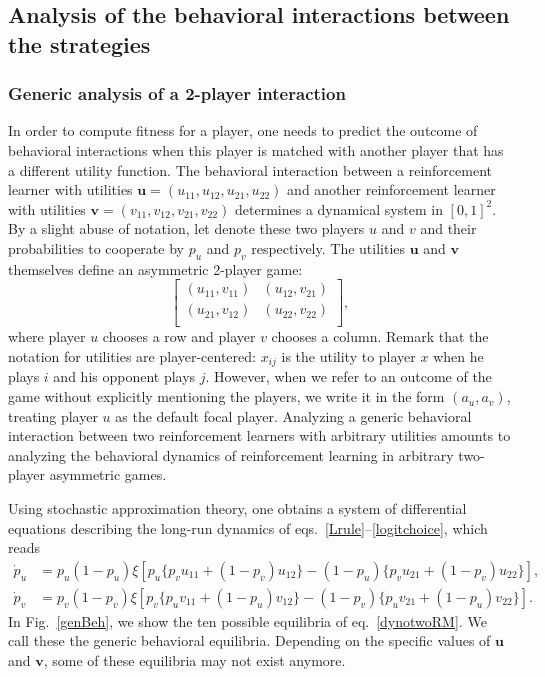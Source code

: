\documentclass[11pt,reqno]{amsart}
\newcommand{\ac}{a} %
\newcommand{\p}{p} %
\newcommand{\xr}{\xi} %
\newcommand{\pf}{u} %
\newcommand{\vpf}{\mathbf{u}} %
\newcommand{\pft}{v} %
\newcommand{\vpft}{\mathbf{v}} %
\begin{document}
\subsection{Analysis of the behavioral interactions between the strategies}


\subsubsection{Generic analysis of a 2-player interaction}

In order to compute fitness for a player, one needs to predict the outcome of behavioral interactions when this player is matched with another player that has a different utility function. The behavioral interaction between a reinforcement learner with utilities $\vpf = (\pf_{11},\pf_{12},\pf_{21},\pf_{22})$ and another reinforcement learner with utilities $\vpft = (\pft_{11},\pft_{12},\pft_{21},\pft_{22})$ determines a dynamical system in $[0,1]^2$. By a slight abuse of notation, let denote these two players $\pf$ and $\pft$ and their probabilities to cooperate by $\p_{\pf}$ and $\p_{\pft}$ respectively. The utilities $\vpf$ and $\vpft$ themselves define an asymmetric 2-player game:
\begin{equation}
\label{prefMat}
\left[ \begin{array}{cc}
    (\pf_{11}, \pft_{11}) & (\pf_{12}, \pft_{21})  \\ 
    (\pf_{21}, \pft_{12}) & (\pf_{22}, \pft_{22})  \\ 
  \end{array}  \right],
\end{equation}
where player $\pf$ chooses a row and player $\pft$ chooses a column. Remark that the notation for utilities are player-centered: $x_{ij}$ is the utility to player $x$ when he plays $i$ and his opponent plays $j$. However, when we refer to an outcome of the game without explicitly mentioning the players, we write it in the form $(\ac_\pf, \ac_\pft)$, treating player $\pf$ as the default focal player. Analyzing a generic behavioral interaction between two reinforcement learners with arbitrary utilities amounts to analyzing the behavioral dynamics of reinforcement learning in arbitrary two-player asymmetric games.

Using stochastic approximation theory, one obtains a system of differential equations describing the long-run dynamics of eqs.~\ref{Lrule}--\ref{logitchoice}, which reads
\begin{align}
\label{dynotwoRM}
 \dot{\p}_u  &=  \p_u(1-\p_u) \xr \left[ \p_u  \{\p_v \pf_{11}+(1-\p_v)\pf_{12}\}  - (1-\p_u) \{\p_v \pf_{21}+(1-\p_v)\pf_{22}\}  \right], \nonumber \\
 \dot{\p}_v  &=  \p_v(1-\p_v) \xr \left[ \p_v \{\p_u \pft_{11}+(1-\p_u)\pft_{12}\}  - (1-\p_v) \{\p_u \pft_{21}+(1-\p_u)\pft_{22}\}  \right].
\end{align}
In Fig.~\ref{genBeh}, we show the ten possible equilibria of eq.~\ref{dynotwoRM}. We call these the generic behavioral equilibria. Depending on the specific values of $\vpf$ and $\vpft$, some of these equilibria may not exist anymore.
\end{document}
